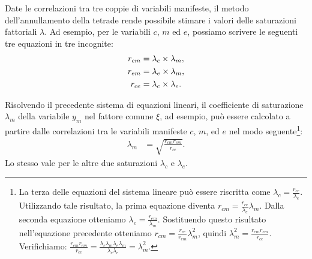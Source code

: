 Date le correlazioni tra tre coppie di variabili manifeste, il metodo dell'annullamento della tetrade
rende possibile stimare i valori delle saturazioni fattoriali $\lambda$.
Ad esempio, per le variabili $c$, $m$ ed $e$, possiamo scrivere le seguenti 
tre equazioni in tre incognite:
\begin{align}
  r_{cm} &= \lambda_c \times \lambda_m, \notag \\
  r_{em} &= \lambda_e \times \lambda_m,  \\
  r_{ce} &= \lambda_c \times \lambda_e. \notag
\end{align}

Risolvendo il precedente sistema di equazioni lineari, il coefficiente di saturazione $\lambda_m$ della variabile $y_m$ nel fattore comune $\xi$, ad esempio, pu{\`o} essere calcolato a partire dalle correlazioni tra le variabili manifeste $c$, $m$, ed $e$ nel modo seguente\footnote{
La terza delle equazioni del sistema lineare può essere riscritta come $\lambda_c = \frac{r_{ce}}{\lambda_e}$.
Utilizzando tale risultato, la prima equazione diventa $r_{cm} = \frac{r_{ce}}{\lambda_e}\lambda_m$. 
Dalla seconda equazione otteniamo $\lambda_e = \frac{r_{em}}{\lambda_m}$.
Sostituendo questo risultato nell'equazione precedente otteniamo $r_{cm} = \frac{r_{ce}}{r_{em}}\lambda_m^2$, quindi $\lambda_m^2 = \frac{r_{cm} r_{em} }{r_{ce}}$.
Verifichiamo: $\frac{r_{cm} r_{em}}{r_{ce}} = \frac{\lambda_c \lambda_m \lambda_e \lambda_m}{\lambda_c \lambda_e} = \lambda_m^2$.
}: 
\begin{align}
  \lambda_m &= \sqrt{ \frac{r_{cm} r_{em}}{r_{ce}}}. 
  \label{eq:tetradi}
\end{align}
Lo stesso vale per le altre due saturazioni $\lambda_c$ e $\lambda_e$.


